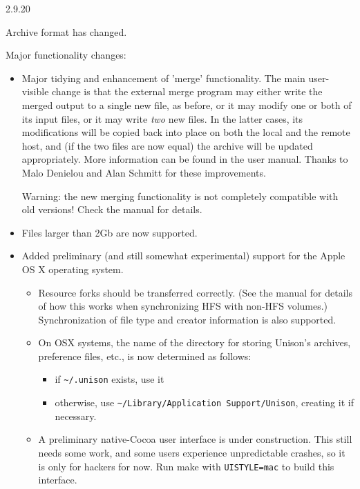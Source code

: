 \begin{changesfromversion}{2.9.20}
\item \incompatible{} Archive format has changed.
\item Major functionality changes:
\begin{itemize}
\item Major tidying and enhancement of 'merge' functionality.  The main
  user-visible change is that the external merge program may either write
  the merged output to a single new file, as before, or it may modify one or
  both of its input files, or it may write {\em two} new files.  In the
  latter cases, its modifications will be copied back into place on both the
  local and the remote host, and (if the two files are now equal) the
  archive will be updated appropriately.  More information can be found in
  the user manual.  Thanks to Malo Denielou and Alan Schmitt for these
  improvements.

  Warning: the new merging functionality is not completely compatible with
  old versions!  Check the manual for details.
\item Files larger than 2Gb are now supported.
\item Added preliminary (and still somewhat experimental) support for the
  Apple OS X operating system.
\begin{itemize}
\item Resource forks should be transferred correctly.  (See the manual for
details of how this works when synchronizing HFS with non-HFS volumes.)
Synchronization of file type and creator information is also supported.
\item On OSX systems, the name of the directory for storing Unison's
archives, preference files, etc., is now determined as follows:
\begin{itemize}
    \item if \verb+~/.unison+ exists, use it
     \item otherwise, use \verb|~/Library/Application Support/Unison|,
         creating it if necessary.
\end{itemize}
\item A preliminary native-Cocoa user interface is under construction.  This
still needs some work, and some users experience unpredictable crashes, so
it is only for hackers for now.  Run make with {\tt UISTYLE=mac} to build
this interface.
\end{itemize}
\end{itemize}


\end{changesfromversion}
